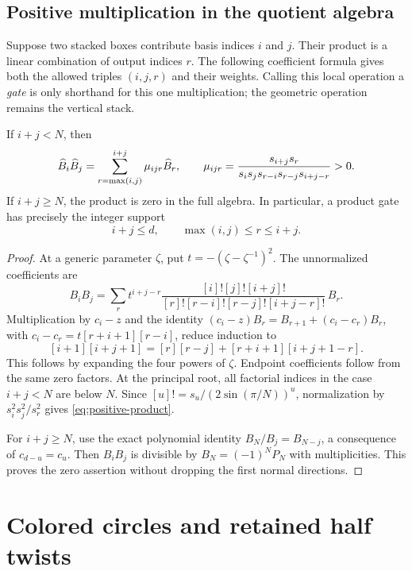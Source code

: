 \subsection{Positive multiplication in the quotient algebra}

Suppose two stacked boxes contribute basis indices $i$ and $j$. Their product is a linear combination of output indices $r$. The following coefficient formula gives both the allowed triples $(i,j,r)$ and their weights. Calling this local operation a \emph{gate} is only shorthand for this one multiplication; the geometric operation remains the vertical stack.
\begin{theorem}\label{thm:positive-product}
If $i+j<N$, then
\begin{equation}\label{eq:positive-product}
 \widehat B_i\widehat B_j=\sum_{r=\max(i,j)}^{i+j}\mu_{ijr}\widehat B_r,
 \qquad
 \mu_{ijr}=\frac{s_{i+j}s_r}
 {s_i s_j s_{r-i}s_{r-j}s_{i+j-r}}>0.
\end{equation}
If $i+j\ge N$, the product is zero in the full algebra. In particular, a product gate has precisely the integer support
\begin{equation}\label{eq:gate-support}
 i+j\le d,\qquad \max(i,j)\le r\le i+j.
\end{equation}
\end{theorem}
\begin{proof}
At a generic parameter $\zeta$, put $t=-(\zeta-\zeta^{-1})^2$. The unnormalized coefficients are
\[
 B_iB_j=\sum_r
 t^{i+j-r}\frac{[i]![j]![i+j]!}
 {[r]![r-i]![r-j]![i+j-r]!}\,B_r.
\]
Multiplication by $c_i-z$ and the identity
$(c_i-z)B_r=B_{r+1}+(c_i-c_r)B_r$, with
$c_i-c_r=t[r+i+1][r-i]$, reduce induction to
\[
 [i+1][i+j+1]=[r][r-j]+[r+i+1][i+j+1-r].
\]
This follows by expanding the four powers of $\zeta$. Endpoint coefficients follow from the same zero factors. At the principal root, all factorial indices in the case $i+j<N$ are below $N$. Since $[u]!=s_u/(2\sin(\pi/N))^u$, normalization by $s_i^2s_j^2/s_r^2$ gives \eqref{eq:positive-product}.

For $i+j\ge N$, use the exact polynomial identity $B_N/B_j=B_{N-j}$, a consequence of $c_{d-u}=c_u$. Then $B_iB_j$ is divisible by $B_N=(-1)^NP_N$ with multiplicities. This proves the zero assertion without dropping the first normal directions.
\end{proof}

\section{Colored circles and retained half twists}\label{nt:colors}

